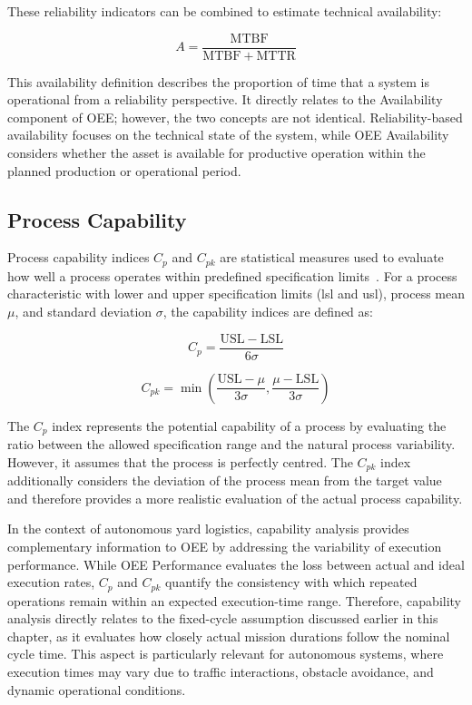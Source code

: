 These reliability indicators can be combined to estimate technical availability:

\[
A = \frac{\mathrm{MTBF}}{\mathrm{MTBF} + \mathrm{MTTR}}
\]

This availability definition describes the proportion of time that a system is operational from a reliability perspective. It directly relates to the Availability component of OEE; however, the two concepts are not identical. Reliability-based availability focuses on the technical state of the system, while OEE Availability considers whether the asset is available for productive operation within the planned production or operational period.
\subsection{Process Capability}
Process capability indices $C_p$ and $C_{pk}$ are statistical measures used to evaluate how well a process operates within predefined specification limits~\cite{six_sigma_cp_cpk}. For a process characteristic with lower and upper specification limits (\gls{lsl} and \gls{usl}), process mean $\mu$, and standard deviation $\sigma$, the capability indices are defined as:

\[
C_p = \frac{\mathrm{USL} - \mathrm{LSL}}{6\sigma}
\]

\[
C_{pk} = \min\left(\frac{\mathrm{USL} - \mu}{3\sigma}, \frac{\mu - \mathrm{LSL}}{3\sigma}\right)
\]

The $C_p$ index represents the potential capability of a process by evaluating the ratio between the allowed specification range and the natural process variability. However, it assumes that the process is perfectly centred. The $C_{pk}$ index additionally considers the deviation of the process mean from the target value and therefore provides a more realistic evaluation of the actual process capability.

In the context of autonomous yard logistics, capability analysis provides complementary information to OEE by addressing the variability of execution performance. While OEE Performance evaluates the loss between actual and ideal execution rates, $C_p$ and $C_{pk}$ quantify the consistency with which repeated operations remain within an expected execution-time range. Therefore, capability analysis directly relates to the fixed-cycle assumption discussed earlier in this chapter, as it evaluates how closely actual mission durations follow the nominal cycle time. This aspect is particularly relevant for autonomous systems, where execution times may vary due to traffic interactions, obstacle avoidance, and dynamic operational conditions.

